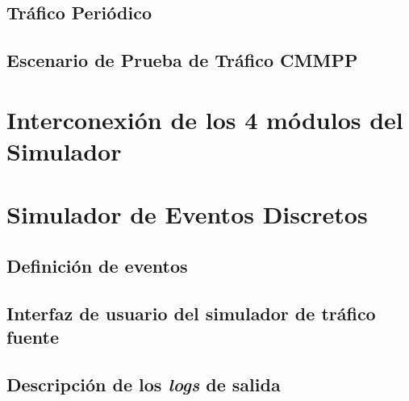 \subsection{Tráfico Periódico}
\subsection{Escenario de Prueba de Tráfico CMMPP}


\hfill

\break


\section{Interconexión de los 4 módulos del Simulador}


\hfill

\break


\section{Simulador de Eventos Discretos}

\subsection{Definición de eventos}

\subsection{Interfaz de usuario del simulador de tráfico fuente}

\subsection{Descripción de los \textit{logs} de salida}

\hfill

\break


